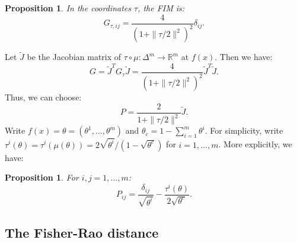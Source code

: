 \documentclass[entropy,article,submit,pdftex,moreauthors]{Definitions/mdpi}
\newcommand{\R}{\ensuremath{\mathbb{R}}}
\theoremstyle{plain}
\newtheorem{proposition}[theorem]{Proposition}
\theoremstyle{definition}
\begin{document}
\begin{proposition}
    \label{prop:stereo}
    In the coordinates $\tau$, the FIM is:
    \begin{equation}
        G_{\tau, ij} = \frac{4}{\left(1+\|\tau/2\|^2\right)^2} \delta_{ij}.
    \end{equation}
\end{proposition}
\noindent Let $\widetilde{J}$ be the Jacobian matrix of $\tau \circ \mu : \Delta^m \rightarrow \R^m$ at $f(x)$. Then we have:
\begin{equation}
    \label{eq:fim2}
    G = \widetilde{J}^T G_\tau \widetilde{J} = \frac{4}{\left(1+\|\tau/2\|^2\right)^2} \widetilde{J}^T \widetilde{J}.
\end{equation}
Thus, we can choose:
\begin{equation}
    \label{eq:matrix_p}
    P = \frac{2}{1+\|\tau/2\|^2} \widetilde{J}.
\end{equation}
 Write $f(x) = \theta = (\theta^1, \dots, \theta^m)$ and $\theta_c = 1 - \sum_{i=1}^m \theta^i$. For simplicity, write $\tau^i(\theta) = \tau^i(\mu(\theta)) = 2\sqrt{\theta^i}/(1 - \sqrt{\theta^c})$ for $i=1, \dots, m$. More explicitly, we have:
\begin{proposition}
    \label{prop:matrix_p}
    For $i,j = 1, \dots, m$:
    \begin{equation}
        P_{ij} = \frac{\delta_{ij}}{\sqrt{\theta^i}} - \frac{\tau^i(\theta)}{2\sqrt{\theta^c}}.
    \end{equation}
\end{proposition}

\subsection{The Fisher-Rao distance}
\label{seq:delta}
\end{document}

